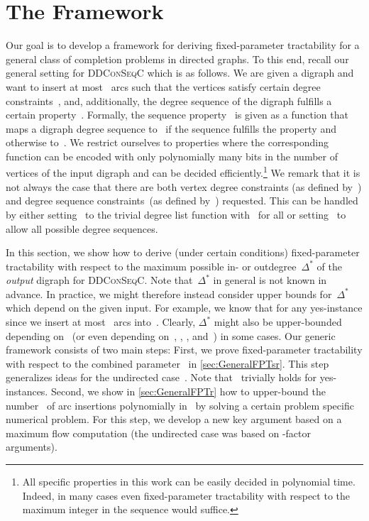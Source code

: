 \documentclass[a4paper,11pt]{article}
\theoremstyle{remark}
\theoremstyle{plain}
\theoremstyle{definition}
\newcommand{\DDCSC}{\textsc{DDConSeqC}\xspace}
\newcommand{\degpara}{\ensuremath{\Delta^*}\xspace}
\begin{document}
\section{The Framework} \label{sec:GeneralSetting}

      Our goal is to develop a framework for deriving fixed-parameter tractability for a general
      class of completion problems in directed graphs.
      To this end, recall our general setting for \DDCSC{} which is as follows.
      We are given a digraph and want to insert at most~ arcs such that the vertices satisfy certain degree constraints~,
      and, additionally, the degree sequence of the digraph fulfills a certain property~.
Formally, the sequence property~ is given as a function that maps a digraph degree sequence to~ if the sequence fulfills the property and otherwise to~.
We restrict ourselves to properties where the corresponding function can be encoded with only polynomially many bits in the number of vertices of the input digraph
and can be decided efficiently.\footnote{All specific properties in this work can be easily decided in polynomial time.
Indeed, in many cases even fixed-parameter tractability with respect to the maximum integer in the sequence would suffice.}
We remark that it is not always the case that there are both vertex degree constraints (as defined by~) and degree sequence constraints~(as defined by~) requested.
This can be handled by either setting~ to the trivial degree list function with~ for all  or setting~ to allow all possible degree sequences.

In this section, we show how to derive (under certain conditions) fixed-parameter tractability with respect to the maximum possible in- or outdegree~\degpara of the \emph{output} digraph for \DDCSC.
Note that~\degpara in general is not known in advance. 
In practice, we might therefore instead consider upper bounds for~\degpara which depend on the given input. 
For example, we know that  for any yes-instance since we insert at most~ arcs into~.
Clearly, \degpara might also be upper-bounded depending on~ (or even depending on~, , , and~) in some cases.
Our generic framework consists of two main steps: First, we prove fixed-parameter tractability with respect to the combined parameter~ in \cref{sec:GeneralFPTsr}.
This step generalizes ideas for the undirected case~\cite{FNN16}.
Note that~ trivially holds for yes-instances.
Second, we show in \cref{sec:GeneralFPTr} how to upper-bound the number~ of arc insertions polynomially in~ by solving a certain problem specific numerical problem.
For this step, we develop a new key argument based on a maximum flow computation (the undirected case was based on -factor arguments).
\end{document}
